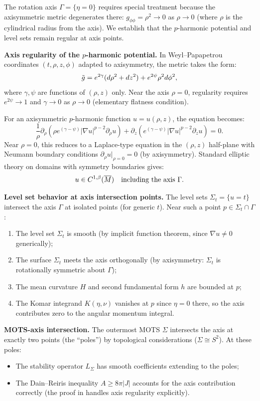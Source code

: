 \begin{remark}\label{rem:axis-regularity}
The rotation axis $\Gamma = \{\eta = 0\}$ requires special treatment because the axisymmetric metric degenerates there: $g_{\phi\phi} = \rho^2 \to 0$ as $\rho \to 0$ (where $\rho$ is the cylindrical radius from the axis). We establish that the $p$-harmonic potential and level sets remain regular at axis points.

\textbf{Axis regularity of the $p$-harmonic potential.} In Weyl--Papapetrou coordinates $(t, \rho, z, \phi)$ adapted to axisymmetry, the metric takes the form:
\[
\tilde{g} = e^{2\gamma}(d\rho^2 + dz^2) + e^{2\psi}\rho^2 d\phi^2,
\]
where $\gamma, \psi$ are functions of $(\rho, z)$ only. Near the axis $\rho = 0$, regularity requires $e^{2\psi} \to 1$ and $\gamma \to 0$ as $\rho \to 0$ (elementary flatness condition).

For an axisymmetric $p$-harmonic function $u = u(\rho, z)$, the equation becomes:
\[
\frac{1}{\rho}\partial_\rho\left(\rho e^{(\gamma-\psi)}|\nabla u|^{p-2}\partial_\rho u\right) + \partial_z\left(e^{(\gamma-\psi)}|\nabla u|^{p-2}\partial_z u\right) = 0.
\]
Near $\rho = 0$, this reduces to a Laplace-type equation in the $(\rho, z)$ half-plane with Neumann boundary conditions $\partial_\rho u|_{\rho=0} = 0$ (by axisymmetry). Standard elliptic theory on domains with symmetry boundaries \cite{morecamping1980} gives:
\[
u \in C^{1,\beta}(\overline{M}) \quad \text{including the axis } \Gamma.
\]

\textbf{Level set behavior at axis intersection points.} The level sets $\Sigma_t = \{u = t\}$ intersect the axis $\Gamma$ at isolated points (for generic $t$). Near such a point $p \in \Sigma_t \cap \Gamma$:
\begin{enumerate}
    \item The level set $\Sigma_t$ is smooth (by implicit function theorem, since $\nabla u \neq 0$ generically);
    \item The surface $\Sigma_t$ meets the axis orthogonally (by axisymmetry: $\Sigma_t$ is rotationally symmetric about $\Gamma$);
    \item The mean curvature $H$ and second fundamental form $h$ are bounded at $p$;
    \item The Komar integrand $K(\eta, \nu)$ vanishes at $p$ since $\eta = 0$ there, so the axis contributes zero to the angular momentum integral.
\end{enumerate}

\textbf{MOTS-axis intersection.} The outermost MOTS $\Sigma$ intersects the axis at exactly two points (the ``poles'') by topological considerations ($\Sigma \cong S^2$). At these poles:
\begin{itemize}
    \item The stability operator $L_\Sigma$ has smooth coefficients extending to the poles;
    \item The Dain--Reiris inequality $A \geq 8\pi|J|$ accounts for the axis contribution correctly (the proof in \cite{dain2011} handles axis regularity explicitly).
\end{itemize}


\end{remark}
